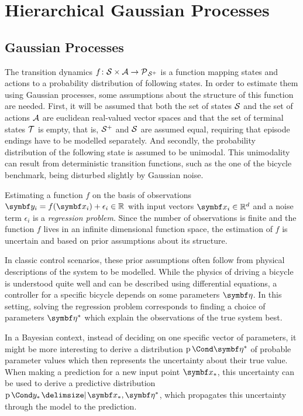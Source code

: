 \chapter{Hierarchical Gaussian Processes}
\label{cha:hierarchical_gaussian_processes}

\section{Gaussian Processes}
\label{sec}
The transition dynamics $f \colon \mathcal{S} \times \mathcal{A} \to \operatorname{\mathcal{P}\mkern1mu}_{\mathcal{S}^+}$ is a function mapping states and actions to a probability distribution of following states.
In order to estimate them using Gaussian processes, some assumptions about the structure of this function are needed.
First, it will be assumed that both the set of states $\mathcal{S}$ and the set of actions $\mathcal{A}$ are euclidean real-valued vector spaces and that the set of terminal states $\mathcal{T}$ is empty, that is, $\mathcal{S}^+$ and $\mathcal{S}$ are assumed equal, requiring that episode endings have to be modelled separately.
And secondly, the probability distribution of the following state is assumed to be unimodal.
This unimodality can result from deterministic transition functions, such as the one of the bicycle benchmark, being disturbed slightly by Gaussian noise.

Estimating a function $f$ on the basis of observations $\mat{y_i} = f(\mat{x_i}) + \epsilon_i \in \Rb$ with input vectors $\mat{x_i} \in \Rb^d$ and a noise term $\epsilon_i$ is a \emph{regression problem}.
Since the number of observations is finite and the function $f$ lives in an infinite dimensional function space, the estimation of $f$ is uncertain and based on prior assumptions about its structure.

In classic control scenarios, these prior assumptions often follow from physical descriptions of the system to be modelled.
While the physics of driving a bicycle is understood quite well and can be described using differential equations, a controller for a specific bicycle depends on some parameters $\rv{\eta}$.
In this setting, solving the regression problem corresponds to finding a choice of parameters $\rv{\eta^\ast}$ which explain the observations of the true system best.

In a Bayesian context, instead of deciding on one specific vector of parameters, it might be more interesting to derive a distribution $\Prob{\rv{\eta^\ast}}$ of probable parameter values which then represents the uncertainty about their true value.
When making a prediction for a new input point $\mat{x_\ast}$, this uncertainty can be used to derive a predictive distribution $\Prob{y_\ast \given \mat{x_\ast}, \mat{\eta^\ast}}$, which propagates this uncertainty through the model to the prediction.

